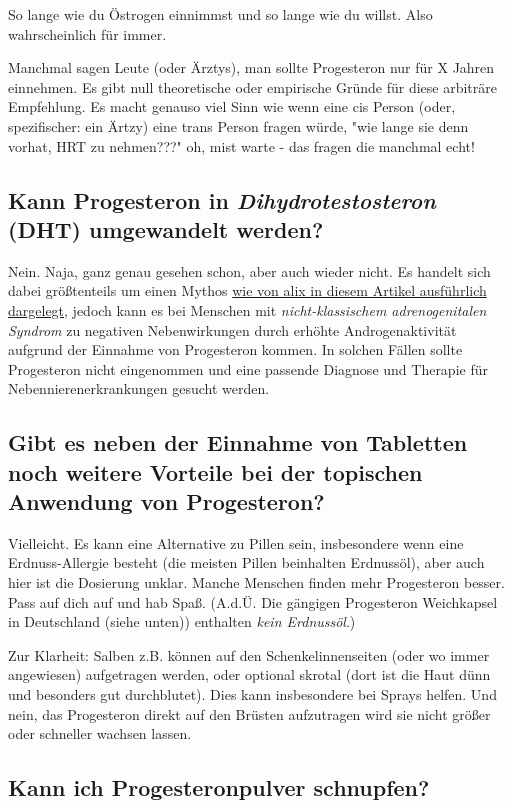 \documentclass{article}
\begin{document}
So lange wie du Östrogen einnimmst und so lange wie du willst. Also wahrscheinlich für immer.

Manchmal sagen Leute (oder Ärztys), man sollte Progesteron nur für X Jahren einnehmen. Es gibt null theoretische oder empirische Gründe für diese arbiträre Empfehlung. Es macht genauso viel Sinn wie wenn eine cis Person (oder, spezifischer: ein Ärtzy) eine trans Person fragen würde, "wie lange sie denn vorhat, HRT zu nehmen???" \textemdash{} oh, mist warte - das fragen die manchmal echt!

\subsection{Kann Progesteron in \textit{Dihydrotestosteron} (DHT) umgewandelt werden?}

Nein. Naja, ganz genau gesehen schon, aber auch wieder nicht. Es handelt sich dabei größtenteils um einen Mythos \href{https://whsah.co/posts/rethinking-progesterone-and-androgens/}{wie von alix in diesem Artikel ausführlich dargelegt}, jedoch kann es bei Menschen mit \textit{nicht-klassischem adrenogenitalen Syndrom} zu negativen Nebenwirkungen durch erhöhte Androgenaktivität aufgrund der Einnahme von Progesteron kommen. In solchen Fällen sollte Progesteron nicht eingenommen und eine passende Diagnose und Therapie für Nebennierenerkrankungen gesucht werden.

\subsection{Gibt es neben der Einnahme von Tabletten noch weitere Vorteile bei der topischen Anwendung von Progesteron?}

Vielleicht. Es kann eine Alternative zu Pillen sein, insbesondere wenn eine Erdnuss-Allergie besteht (die meisten Pillen beinhalten Erdnussöl), aber auch hier ist die Dosierung unklar. Manche Menschen finden mehr Progesteron besser. Pass auf dich auf und hab Spaß. (A.d.Ü. Die gängigen Progesteron Weichkapsel in Deutschland (siehe unten)) enthalten \textit{kein Erdnussöl}.)

Zur Klarheit: Salben z.B. können auf den Schenkelinnenseiten (oder wo immer angewiesen) aufgetragen werden, oder optional skrotal (dort ist die Haut dünn und besonders gut durchblutet). Dies kann insbesondere bei Sprays helfen. Und nein, das Progesteron direkt auf den Brüsten aufzutragen wird sie nicht größer oder schneller wachsen lassen.

\subsection{Kann ich Progesteronpulver schnupfen?}
\end{document}
